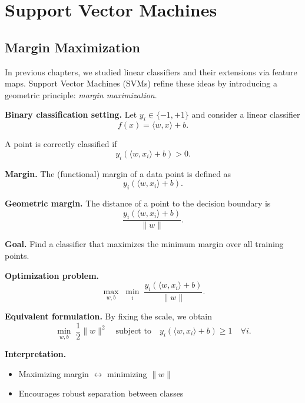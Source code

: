 \chapter{Support Vector Machines}

\section{Margin Maximization}

In previous chapters, we studied linear classifiers and their extensions via feature maps. Support Vector Machines (SVMs) refine these ideas by introducing a geometric principle: \emph{margin maximization}.

\medskip

\noindent
\textbf{Binary classification setting.}  
Let $y_i \in \{-1, +1\}$ and consider a linear classifier
\[
f(x) = \langle w, x \rangle + b.
\]

\medskip

\noindent
A point is correctly classified if
\[
y_i (\langle w, x_i \rangle + b) > 0.
\]

\medskip

\noindent
\textbf{Margin.}  
The (functional) margin of a data point is defined as
\[
y_i (\langle w, x_i \rangle + b).
\]

\medskip

\noindent
\textbf{Geometric margin.}  
The distance of a point to the decision boundary is
\[
\frac{y_i (\langle w, x_i \rangle + b)}{\|w\|}.
\]

\medskip

\noindent
\textbf{Goal.}  
Find a classifier that maximizes the minimum margin over all training points.

\medskip

\noindent
\textbf{Optimization problem.}
\[
\max_{w,b} \; \min_{i} \; \frac{y_i (\langle w, x_i \rangle + b)}{\|w\|}.
\]

\medskip

\noindent
\textbf{Equivalent formulation.}  
By fixing the scale, we obtain
\[
\min_{w,b} \; \frac{1}{2}\|w\|^2
\quad \text{subject to} \quad
y_i (\langle w, x_i \rangle + b) \geq 1 \quad \forall i.
\]

\medskip

\noindent
\textbf{Interpretation.}
\begin{itemize}
    \item Maximizing margin $\leftrightarrow$ minimizing $\|w\|$
    \item Encourages robust separation between classes
\end{itemize}

